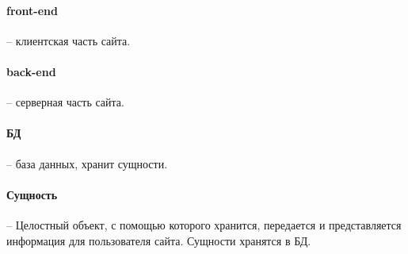 \paragraph{front-end} -- клиентская часть сайта.
\paragraph{back-end} -- серверная часть сайта.
\paragraph{БД} -- база данных, хранит сущности.
\paragraph{Сущность} -- Целостный объект, с помощью которого хранится, передается и представляется информация для пользователя сайта. Сущности хранятся в БД.
